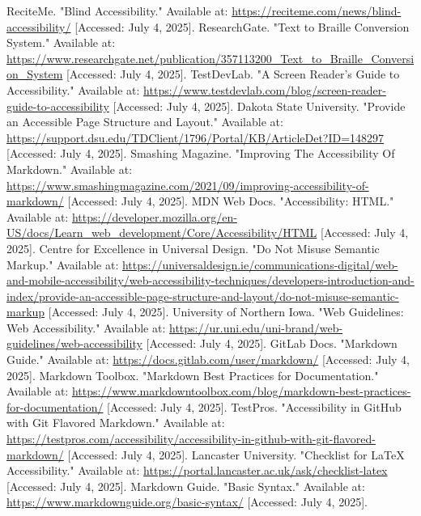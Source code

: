 \begin{thebibliography}{99}
	 ReciteMe. "Blind Accessibility." Available at: \url{https://reciteme.com/news/blind-accessibility/} [Accessed: July 4, 2025].
	 ResearchGate. "Text to Braille Conversion System." Available at: \url{https://www.researchgate.net/publication/357113200_Text_to_Braille_Conversion_System} [Accessed: July 4, 2025].
	 TestDevLab. "A Screen Reader’s Guide to Accessibility." Available at: \url{https://www.testdevlab.com/blog/screen-reader-guide-to-accessibility} [Accessed: July 4, 2025].
	 Dakota State University. "Provide an Accessible Page Structure and Layout." Available at: \url{https://support.dsu.edu/TDClient/1796/Portal/KB/ArticleDet?ID=148297} [Accessed: July 4, 2025].
	 Smashing Magazine. "Improving The Accessibility Of Markdown." Available at: \url{https://www.smashingmagazine.com/2021/09/improving-accessibility-of-markdown/} [Accessed: July 4, 2025].
	 MDN Web Docs. "Accessibility: HTML." Available at: \url{https://developer.mozilla.org/en-US/docs/Learn_web_development/Core/Accessibility/HTML} [Accessed: July 4, 2025].
	 Centre for Excellence in Universal Design. "Do Not Misuse Semantic Markup." Available at: \url{https://universaldesign.ie/communications-digital/web-and-mobile-accessibility/web-accessibility-techniques/developers-introduction-and-index/provide-an-accessible-page-structure-and-layout/do-not-misuse-semantic-markup} [Accessed: July 4, 2025].
	 University of Northern Iowa. "Web Guidelines: Web Accessibility." Available at: \url{https://ur.uni.edu/uni-brand/web-guidelines/web-accessibility} [Accessed: July 4, 2025].
	 GitLab Docs. "Markdown Guide." Available at: \url{https://docs.gitlab.com/user/markdown/} [Accessed: July 4, 2025].
	 Markdown Toolbox. "Markdown Best Practices for Documentation." Available at: \url{https://www.markdowntoolbox.com/blog/markdown-best-practices-for-documentation/} [Accessed: July 4, 2025].
	 TestPros. "Accessibility in GitHub with Git Flavored Markdown." Available at: \url{https://testpros.com/accessibility/accessibility-in-github-with-git-flavored-markdown/} [Accessed: July 4, 2025].
	 Lancaster University. "Checklist for LaTeX Accessibility." Available at: \url{https://portal.lancaster.ac.uk/ask/checklist-latex} [Accessed: July 4, 2025].
	 Markdown Guide. "Basic Syntax." Available at: \url{https://www.markdownguide.org/basic-syntax/} [Accessed: July 4, 2025].

\end{thebibliography}
